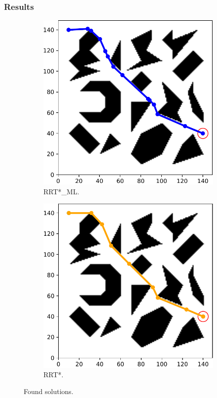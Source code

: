 \documentclass{beamer}
\begin{document}
\begin{frame}
	\frametitle{Results}	
	\begin{figure}[!ht]
		\centering
		\begin{subfigure}[b]{0.435\textwidth}
		  \includegraphics[width=\textwidth]{figChap5/Maze_clutter_final_solution_RRTstarML.pdf}  
		  \caption{RRT*\_ML.}
		\end{subfigure}  
		\begin{subfigure}[b]{0.435\textwidth}
		  \includegraphics[width=\textwidth]{figChap5/Maze_clutter_final_solution_RRTstar2.pdf}  
		  \caption{RRT*.} 
		\end{subfigure}   
		\caption{Found solutions.} 
	  \end{figure}
\end{frame}	
\end{document}
